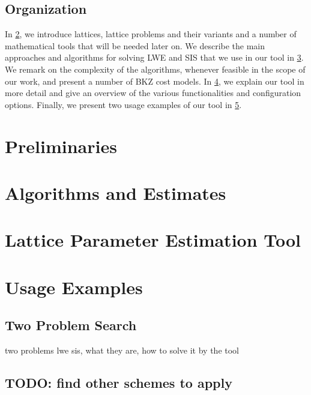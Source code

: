 \documentclass[
  a4paper,  %
  twoside,  %
  bibliography=totoc,
  headsepline,
  cleardoublepage=empty,
  parskip=half,
  draft=false
]{scrbook}
\begin{document}
\section{Organization}
In \cref{ch:preliminaries}, we introduce lattices, lattice problems and their variants and a number of mathematical tools that will be needed later on. We describe the main approaches and algorithms for solving LWE and SIS that we use in our tool in \cref{ch:algorithms}. We remark on the complexity of the algorithms, whenever feasible in the scope of our work, and present a number of BKZ cost models. In \cref{ch:tool}, we explain our tool in more detail and give an overview of the various functionalities and configuration options. Finally, we present two usage examples of our tool in \cref{ch:usage}. %

\chapter{Preliminaries} \label{ch:preliminaries}



\chapter{Algorithms and Estimates}\label{ch:algorithms}




\chapter{Lattice Parameter Estimation Tool}\label{ch:tool}



\chapter{Usage Examples}\label{ch:usage}
\section{Two Problem Search}\label{sec:two-problem-search}
two problems lwe sis, what they are, how to solve it by the tool
\section{TODO: find other schemes to apply}
\end{document}
